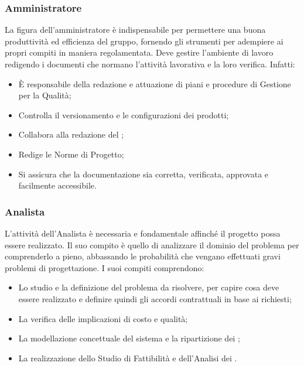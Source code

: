 \documentclass[NormeDiProgetto.tex]{subfiles}
\begin{document}
	\subsubsection{Amministratore}
	La figura dell'amministratore è indispensabile per permettere una buona produttività ed efficienza del gruppo, fornendo gli strumenti per adempiere ai propri compiti in maniera regolamentata. Deve gestire l'ambiente di lavoro redigendo i documenti che normano l'attività lavorativa e la loro verifica. Infatti:
	\begin{itemize}
		\item È responsabile della redazione e attuazione di piani e procedure di Gestione per la Qualità;
		\item Controlla il versionamento e le configurazioni dei prodotti;
		\item Collabora alla redazione del \pdp;
		\item Redige le Norme di Progetto;
		\item Si assicura che la documentazione sia corretta, verificata, approvata e facilmente accessibile.
	\end{itemize}

	\subsubsection{Analista}
	L'attività dell'Analista è necessaria e fondamentale affinché il progetto possa essere realizzato. Il suo compito è quello di analizzare il dominio del problema per comprenderlo a pieno, abbassando le probabilità che vengano effettuati gravi problemi di progettazione. I suoi compiti comprendono:
	\begin{itemize}
		\item Lo studio e la definizione del problema da risolvere, per capire cosa deve essere realizzato e definire quindi gli accordi contrattuali in base ai  richiesti;
		\item La verifica delle implicazioni di costo e qualità;
		\item La modellazione concettuale del sistema e la ripartizione dei ;
		\item La realizzazione dello Studio di Fattibilità e dell'Analisi dei .
	\end{itemize}
\end{document}
